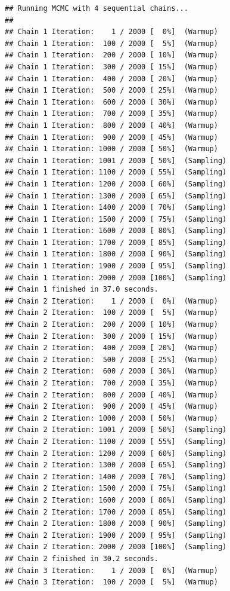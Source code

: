 \documentclass[
]{article}
\begin{document}
\begin{verbatim}
## Running MCMC with 4 sequential chains...
## 
## Chain 1 Iteration:    1 / 2000 [  0%]  (Warmup) 
## Chain 1 Iteration:  100 / 2000 [  5%]  (Warmup) 
## Chain 1 Iteration:  200 / 2000 [ 10%]  (Warmup) 
## Chain 1 Iteration:  300 / 2000 [ 15%]  (Warmup) 
## Chain 1 Iteration:  400 / 2000 [ 20%]  (Warmup) 
## Chain 1 Iteration:  500 / 2000 [ 25%]  (Warmup) 
## Chain 1 Iteration:  600 / 2000 [ 30%]  (Warmup) 
## Chain 1 Iteration:  700 / 2000 [ 35%]  (Warmup) 
## Chain 1 Iteration:  800 / 2000 [ 40%]  (Warmup) 
## Chain 1 Iteration:  900 / 2000 [ 45%]  (Warmup) 
## Chain 1 Iteration: 1000 / 2000 [ 50%]  (Warmup) 
## Chain 1 Iteration: 1001 / 2000 [ 50%]  (Sampling) 
## Chain 1 Iteration: 1100 / 2000 [ 55%]  (Sampling) 
## Chain 1 Iteration: 1200 / 2000 [ 60%]  (Sampling) 
## Chain 1 Iteration: 1300 / 2000 [ 65%]  (Sampling) 
## Chain 1 Iteration: 1400 / 2000 [ 70%]  (Sampling) 
## Chain 1 Iteration: 1500 / 2000 [ 75%]  (Sampling) 
## Chain 1 Iteration: 1600 / 2000 [ 80%]  (Sampling) 
## Chain 1 Iteration: 1700 / 2000 [ 85%]  (Sampling) 
## Chain 1 Iteration: 1800 / 2000 [ 90%]  (Sampling) 
## Chain 1 Iteration: 1900 / 2000 [ 95%]  (Sampling) 
## Chain 1 Iteration: 2000 / 2000 [100%]  (Sampling) 
## Chain 1 finished in 37.0 seconds.
## Chain 2 Iteration:    1 / 2000 [  0%]  (Warmup) 
## Chain 2 Iteration:  100 / 2000 [  5%]  (Warmup) 
## Chain 2 Iteration:  200 / 2000 [ 10%]  (Warmup) 
## Chain 2 Iteration:  300 / 2000 [ 15%]  (Warmup) 
## Chain 2 Iteration:  400 / 2000 [ 20%]  (Warmup) 
## Chain 2 Iteration:  500 / 2000 [ 25%]  (Warmup) 
## Chain 2 Iteration:  600 / 2000 [ 30%]  (Warmup) 
## Chain 2 Iteration:  700 / 2000 [ 35%]  (Warmup) 
## Chain 2 Iteration:  800 / 2000 [ 40%]  (Warmup) 
## Chain 2 Iteration:  900 / 2000 [ 45%]  (Warmup) 
## Chain 2 Iteration: 1000 / 2000 [ 50%]  (Warmup) 
## Chain 2 Iteration: 1001 / 2000 [ 50%]  (Sampling) 
## Chain 2 Iteration: 1100 / 2000 [ 55%]  (Sampling) 
## Chain 2 Iteration: 1200 / 2000 [ 60%]  (Sampling) 
## Chain 2 Iteration: 1300 / 2000 [ 65%]  (Sampling) 
## Chain 2 Iteration: 1400 / 2000 [ 70%]  (Sampling) 
## Chain 2 Iteration: 1500 / 2000 [ 75%]  (Sampling) 
## Chain 2 Iteration: 1600 / 2000 [ 80%]  (Sampling) 
## Chain 2 Iteration: 1700 / 2000 [ 85%]  (Sampling) 
## Chain 2 Iteration: 1800 / 2000 [ 90%]  (Sampling) 
## Chain 2 Iteration: 1900 / 2000 [ 95%]  (Sampling) 
## Chain 2 Iteration: 2000 / 2000 [100%]  (Sampling) 
## Chain 2 finished in 30.2 seconds.
## Chain 3 Iteration:    1 / 2000 [  0%]  (Warmup) 
## Chain 3 Iteration:  100 / 2000 [  5%]  (Warmup) 

\end{verbatim}
\end{document}

